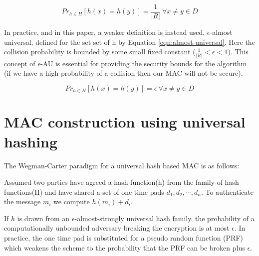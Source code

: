 \documentclass[10pt]{article} %
\begin{document}
\begin{equation}
Pr_{h \in H}[h(x) = h(y)] = \frac{1}{|R|}\ \forall x \neq y \in D
\label{eqn:universal-hashing}
\end{equation}

In practice, and in this paper, a weaker definition is instead used,
$\epsilon$-almost universal, defined for the set set of h by Equation
\ref{eqn:almost-universal}. Here
the collision probability is bounded by some small fixed constant
($\frac{1}{|R|} < \epsilon < 1$). This concept of $\epsilon$-AU is essential
for providing the security bounds for the algorithm (if we have a high
probability of a collision then our MAC will not be secure).

\begin{equation}
Pr_{h \in H}[h(x) = h(y)] = \epsilon\ \forall x \neq y \in D
\label{eqn:almost-universal}
\end{equation}

%

\section{MAC construction using universal hashing}
The Wegman-Carter paradigm for a universal hash based MAC is as follows:

Assumed two parties have agreed a hash function(h) from the family of hash
functions(H)  and have shared a set of one time pads $d_1,d_2,\cdots,d_n$. To
authenticate the message $m_i$ we compute $h(m_i)+d_i$.

If $h$ is drawn from an $\epsilon$-almost-strongly universal hash family, the
probability of a computationally unbounded adversary breaking the encryption
is at most $\epsilon$. In practice, the one time pad is substituted for a
pseudo random function (PRF) which weakens the scheme to the probability that
the PRF can be broken plus $\epsilon$.
\end{document}

